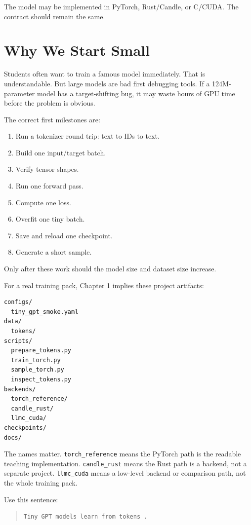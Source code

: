 The model may be implemented in PyTorch, Rust/Candle, or C/CUDA. The contract should remain the same.

\section{Why We Start Small}

Students often want to train a famous model immediately. That is understandable. But large models are bad first debugging tools. If a 124M-parameter model has a target-shifting bug, it may waste hours of GPU time before the problem is obvious.

The correct first milestones are:

\begin{enumerate}
  \item Run a tokenizer round trip: text to IDs to text.
  \item Build one input/target batch.
  \item Verify tensor shapes.
  \item Run one forward pass.
  \item Compute one loss.
  \item Overfit one tiny batch.
  \item Save and reload one checkpoint.
  \item Generate a short sample.
\end{enumerate}

Only after these work should the model size and dataset size increase.

\engineering

For a real training pack, Chapter 1 implies these project artifacts:

\begin{lstlisting}
configs/
  tiny_gpt_smoke.yaml
data/
  tokens/
scripts/
  prepare_tokens.py
  train_torch.py
  sample_torch.py
  inspect_tokens.py
backends/
  torch_reference/
  candle_rust/
  llmc_cuda/
checkpoints/
docs/
\end{lstlisting}

The names matter. \texttt{torch\_reference} means the PyTorch path is the readable teaching implementation. \texttt{candle\_rust} means the Rust path is a backend, not a separate project. \texttt{llmc\_cuda} means a low-level backend or comparison path, not the whole training pack.


Use this sentence:

\begin{quote}
\texttt{Tiny GPT models learn from tokens .}
\end{quote}

